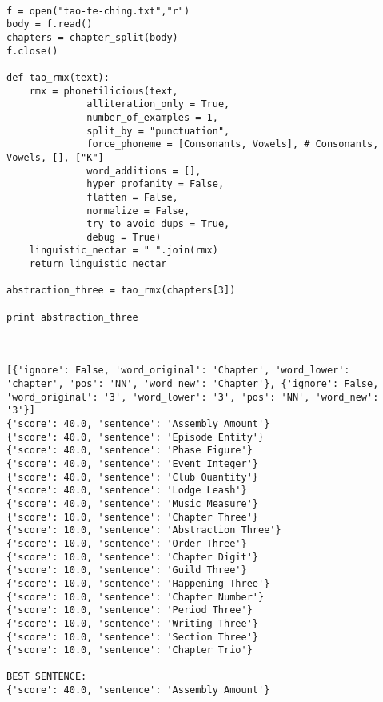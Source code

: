 \documentclass[12pt,a4paper,oneside]{book}
\begin{document}
\begin{verbatim}

f = open("tao-te-ching.txt","r")
body = f.read()
chapters = chapter_split(body)
f.close()

def tao_rmx(text):
    rmx = phonetilicious(text,
              alliteration_only = True, 
              number_of_examples = 1, 
              split_by = "punctuation",
              force_phoneme = [Consonants, Vowels], # Consonants, Vowels, [], ["K"]
              word_additions = [],
              hyper_profanity = False,
              flatten = False, 
              normalize = False, 
              try_to_avoid_dups = True,
              debug = True)
    linguistic_nectar = " ".join(rmx)
    return linguistic_nectar
    
abstraction_three = tao_rmx(chapters[3])
 
print abstraction_three



[{'ignore': False, 'word_original': 'Chapter', 'word_lower': 'chapter', 'pos': 'NN', 'word_new': 'Chapter'}, {'ignore': False, 'word_original': '3', 'word_lower': '3', 'pos': 'NN', 'word_new': '3'}]
{'score': 40.0, 'sentence': 'Assembly Amount'}
{'score': 40.0, 'sentence': 'Episode Entity'}
{'score': 40.0, 'sentence': 'Phase Figure'}
{'score': 40.0, 'sentence': 'Event Integer'}
{'score': 40.0, 'sentence': 'Club Quantity'}
{'score': 40.0, 'sentence': 'Lodge Leash'}
{'score': 40.0, 'sentence': 'Music Measure'}
{'score': 10.0, 'sentence': 'Chapter Three'}
{'score': 10.0, 'sentence': 'Abstraction Three'}
{'score': 10.0, 'sentence': 'Order Three'}
{'score': 10.0, 'sentence': 'Chapter Digit'}
{'score': 10.0, 'sentence': 'Guild Three'}
{'score': 10.0, 'sentence': 'Happening Three'}
{'score': 10.0, 'sentence': 'Chapter Number'}
{'score': 10.0, 'sentence': 'Period Three'}
{'score': 10.0, 'sentence': 'Writing Three'}
{'score': 10.0, 'sentence': 'Section Three'}
{'score': 10.0, 'sentence': 'Chapter Trio'}

BEST SENTENCE:
{'score': 40.0, 'sentence': 'Assembly Amount'}


\end{verbatim}
\end{document}
